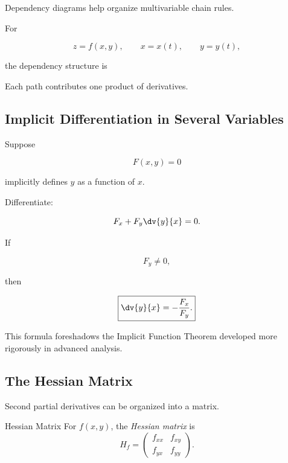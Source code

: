 Dependency diagrams help organize multivariable chain rules.

For

\[ z=f(x,y),\qquad x=x(t),\qquad y=y(t), \]

the dependency structure is

\begin{center}
\end{center}

Each path contributes one product of derivatives.

\subsection{Implicit Differentiation in Several Variables}
\label{subsec:multivariable-implicit}

Suppose

\[ F(x,y)=0 \]

implicitly defines \(y\) as a function of \(x\).

Differentiate:

\[ F_x+F_y\dv{y}{x}=0. \]

If

\[ F_y\neq0, \]

then

\[ \boxed{\dv{y}{x}=-\frac{F_x}{F_y}.} \]

This formula foreshadows the Implicit Function Theorem developed more
rigorously in advanced analysis.

\subsection{The Hessian Matrix}
\label{subsec:hessian}

Second partial derivatives can be organized into a matrix.

\begin{definitionbox}{Hessian Matrix}
For \(f(x,y)\), the \emph{Hessian matrix} is
\[ H_f=
\begin{pmatrix}
f_{xx} & f_{xy}\\
f_{yx} & f_{yy}
\end{pmatrix}. \]
\end{definitionbox}

